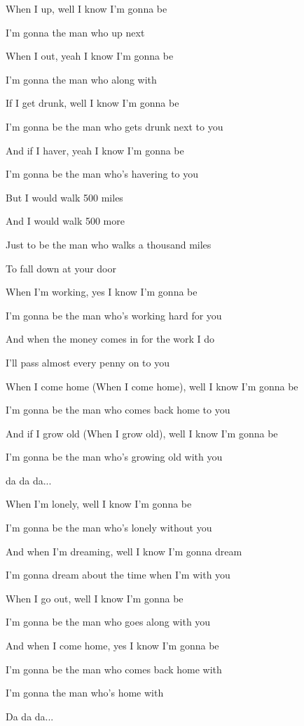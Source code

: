 

\zs
When I  up, well I know I'm gonna be

I'm gonna  the man who  up next 

When I  out, yeah I know I'm gonna be

I'm gonna  the man who  along with 

\ks

\zs
If I get drunk, well I know I'm gonna be

I'm gonna be the man who gets drunk next to you

And if I haver, yeah I know I'm gonna be

I'm gonna be the man who's havering to you
\ks

\zr
But I would walk 500 miles

And I would walk 500 more

Just to be the man who walks a thousand miles

To fall down at your door
\kr

\zs
When I'm working, yes I know I'm gonna be

I'm gonna be the man who's working hard for you

And when the money comes in for the work I do

I'll pass almost every penny on to you
\ks

\zs
When I come home (When I come home), well I know I'm gonna be

I'm gonna be the man who comes back home to you

And if I grow old (When I grow old), well I know I'm gonna be

I'm gonna be the man who's growing old with you
\ks

\zr \kr

da da da...


\zs
When I'm lonely, well I know I'm gonna be

I'm gonna be the man who's lonely without you

And when I'm dreaming, well I know I'm gonna dream

I'm gonna dream about the time when I'm with you
\ks

\zs
When I go out, well I know I'm gonna be

I'm gonna be the man who goes along with you

And when I come home, yes I know I'm gonna be

I'm gonna be the man who comes back home with 

I'm gonna  the man who's  home with 
\ks

\zr \kr

Da da da...

\zr \kr
\kp






















